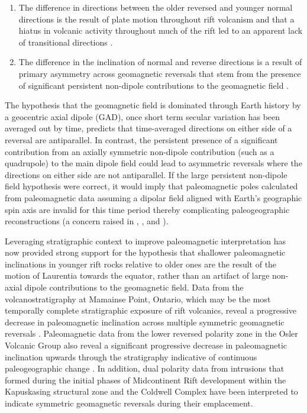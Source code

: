 \documentclass[11pt,letterpaper]{article}
\begin{document}
\begin{enumerate}
\item The difference in directions between the older reversed and younger normal directions is the result of plate motion throughout rift volcanism and that a hiatus in volcanic activity throughout much of the rift led to an apparent lack of transitional directions \citep{Davis1997a,Schmidt2003a}.
\item The difference in the inclination of normal and reverse directions is a result of primary asymmetry across geomagnetic reversals that stem from the presence of significant persistent non-dipole contributions to the geomagnetic field \citep{Pesonen1981a,Nevanlinna1983a,Buchan1990a}.
\end{enumerate}

The hypothesis that the geomagnetic field is dominated through Earth history by a geocentric axial dipole (GAD), once short term secular variation has been averaged out by time, predicts that time-averaged directions on either side of a reversal are antiparallel. In contrast, the persistent presence of a significant contribution from an axially symmetric non-dipole contribution (such as a quadrupole) to the main dipole field could lead to asymmetric reversals where the directions on either side are not antiparallel. If the large persistent non-dipole field hypothesis were correct, it would imply that paleomagnetic poles calculated from paleomagnetic data assuming a dipolar field aligned with Earth's geographic spin axis are invalid for this time period thereby complicating paleogeographic reconstructions (a concern raised in \citealp{Weil1998a}, \citealp{Buchan2001a}, and \citealp{Piper2007a}).

Leveraging stratigraphic context to improve paleomagnetic interpretation has now provided strong support for the hypothesis that shallower paleomagnetic inclinations in younger rift rocks relative to older ones are the result of the motion of Laurentia towards the equator, rather than an artifact of large non-axial dipole contributions to the geomagnetic field. Data from the volcanostratigraphy at Mamainse Point, Ontario, which may be the most temporally complete stratigraphic exposure of rift volcanics, reveal a progressive decrease in paleomagnetic inclination across multiple symmetric geomagnetic reversals \citep{Swanson-Hysell2009a, Swanson-Hysell2014a}. Paleomagnetic data from the lower reversed polarity zone in the Osler Volcanic Group also reveal a significant progressive decrease in paleomagnetic inclination upwards through the stratigraphy indicative of continuous paleogeographic change \citep{Swanson-Hysell2014b}. In addition, dual polarity data from intrusions that formed during the initial phases of Midcontinent Rift development within the Kapuskasing structural zone \citep{Symons1994a} and the Coldwell Complex \citep{Kulakov2014a} have been interpreted to indicate symmetric geomagnetic reversals during their emplacement.
\end{document}
